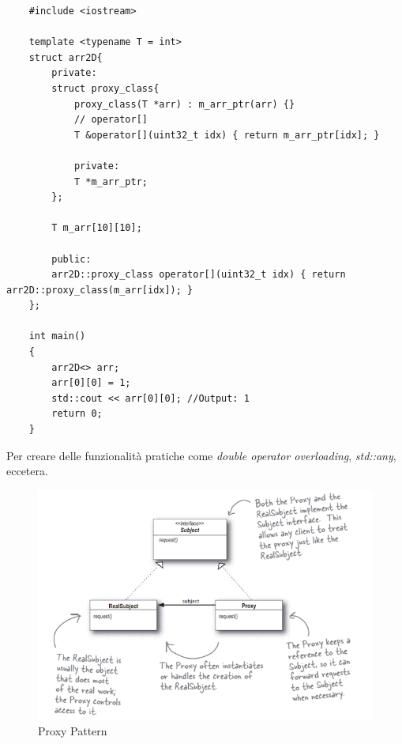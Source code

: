 \begin{lstlisting}
	#include <iostream>
	
	template <typename T = int>
	struct arr2D{
		private:
		struct proxy_class{
			proxy_class(T *arr) : m_arr_ptr(arr) {}
			// operator[]
			T &operator[](uint32_t idx) { return m_arr_ptr[idx]; }
			
			private:
			T *m_arr_ptr;
		};
		
		T m_arr[10][10];
		
		public:
		arr2D::proxy_class operator[](uint32_t idx) { return arr2D::proxy_class(m_arr[idx]); }
	};
	
	int main()
	{
		arr2D<> arr;
		arr[0][0] = 1;
		std::cout << arr[0][0]; //Output: 1
		return 0;
	}
\end{lstlisting}

\textsf{\small Per creare delle funzionalità pratiche come \emph{double operator overloading}, \emph{std::any}, eccetera.} \\

\newpage %

\begin{figure}[H]
	\centering
	\includegraphics[width=1\textwidth, height=1\textheight, keepaspectratio]{./imgs/Design_Patterns/Proxy_Pattern.png}
	\caption{Proxy Pattern}
	\label{fig:Proxy_Pattern}
\end{figure}

